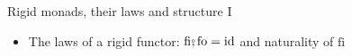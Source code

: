 \documentclass[english]{beamer}
\makeatletter
\newcommand{\bef}{\ensuremath\raisebox{2pt}{$\mathsmaller{\mathsmaller{\circ}}$}\hspace{-3.3pt},}
\newcommand{\xyScaleX}[1]{%
\makeatletter
\xydef@\xymatrixcolsep@{#1}
\makeatother
} %
\newcommand{\xyScaleY}[1]{%
\makeatletter
\xydef@\xymatrixrowsep@{#1}
\makeatother
} %
\makeatother
\begin{document}
\begin{frame}{Rigid monads, their laws and structure I}
\begin{itemize}
\begin{itemize}
{\[
\xymatrix{\xyScaleY{1pc}\xyScaleX{1.5pc}A\Rightarrow R^{B}\ar[d]\sp(0.4){\text{fi}} & \times\quad\quad B\Rightarrow R^{C}~\ar[d]\sp(0.4){\text{fi}}\ar[rr]\sb(0.5){\text{use }\diamond_{R}} &  & A\Rightarrow R^{C}\ar[d]\sp(0.4){\text{fi}}\\
R^{A\Rightarrow B} & \times\quad\quad R^{B\Rightarrow C}\quad~\ar[r]\sb(0.5){\text{use }\bowtie} & R^{\left(A\Rightarrow B\right)\times\left(B\Rightarrow C\right)}\ar[r]\sb(0.6){~\text{fmap}\left(\bef\right)} & R^{A\Rightarrow C}
}
\]
}{\small\par}
\item {\footnotesize{}\vspace{-0.25cm}}{\small{}Alternative formulation:
$\text{flm}=\text{fi}\bef\text{pa}$ where $\text{pa}:R^{A\Rightarrow B}\Rightarrow R^{A}\Rightarrow R^{B}$}{\small\par}
\item Then $\text{fi}\bef\text{fo}=\text{id}$. Proof: $\text{fo}\,x\,a=\text{pa}\,x\,\left(\text{pure}\,a\right)$;
set $x^{:R^{A\Rightarrow B}}=\text{fi}\,h^{:A\Rightarrow R^{B}}$
and get $\text{fo}\,x\,a=\text{pa}\,\left(\text{fi}\,h\right)\left(\text{pure}\,a\right)=\text{flm}\,h\left(\text{pure}\,a\right)=h\,a$,
so $\text{fo}\left(\text{fi}\,h\right)=h$ 
\item If $\text{fi}\bef\text{fo}=\text{id}$ and $R$ is a monad then {\small{}$\text{flm}=\text{fi}\bef\text{pa}$}. 
\end{itemize}
\item {\footnotesize{}\vspace{-0.1cm}}The laws of a rigid functor: $\text{fi}\bef\text{fo}=\text{id}$
and naturality of $\text{fi}$
\end{itemize}
\end{frame}
\end{document}
